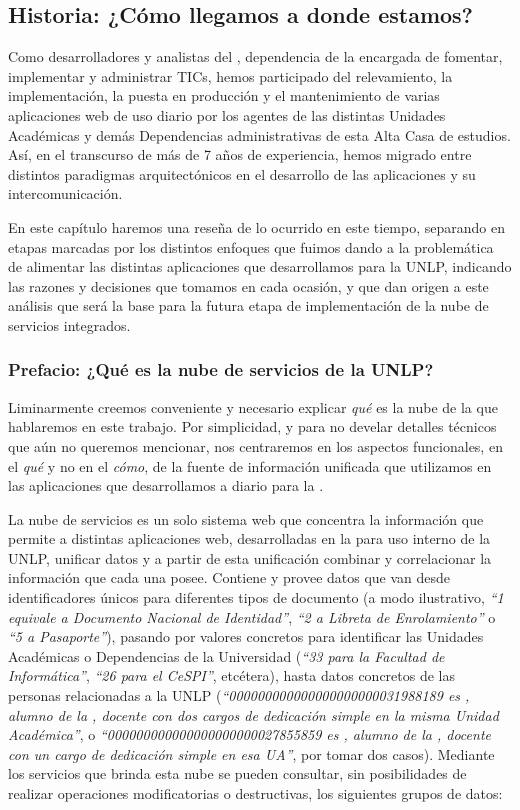 \subsection{Historia: ¿Cómo llegamos a donde estamos?}
\label{nube:historia}

Como desarrolladores y analistas del {\cespi}, dependencia de la {\unlp} encargada de fomentar, implementar y administrar TICs, hemos participado del relevamiento, la implementación, la puesta en producción y el mantenimiento de varias aplicaciones web de uso diario por los agentes de las distintas Unidades Académicas y demás Dependencias administrativas de esta Alta Casa de estudios. Así, en el transcurso de más de 7 años de experiencia, hemos migrado entre distintos paradigmas arquitectónicos en el desarrollo de las aplicaciones y su intercomunicación.

En este capítulo haremos una reseña de lo ocurrido en este tiempo, separando en etapas marcadas por los distintos enfoques que fuimos dando a la problemática de alimentar las distintas aplicaciones que desarrollamos para la UNLP, indicando las razones y decisiones que tomamos en cada ocasión, y que dan origen a este análisis que será la base para la futura etapa de implementación de la nube de servicios integrados.


\subsubsection{Prefacio: ¿Qué es la nube de servicios de la UNLP?}
\label{nube:prefacio}

Liminarmente creemos conveniente y necesario explicar \textit{qué} es la nube de la que hablaremos en este trabajo. Por simplicidad, y para no develar detalles técnicos que aún no queremos mencionar, nos centraremos en los aspectos funcionales, en el \textit{qué} y no en el \textit{cómo}, de la fuente de información unificada que utilizamos en las aplicaciones que desarrollamos a diario para la {\unlp}.

La nube de servicios es un solo sistema web que concentra la información que permite a distintas aplicaciones web, desarrolladas en la {\direccionDesarrollo} para uso interno de la UNLP, unificar datos y a partir de esta unificación combinar y correlacionar la información que cada una posee. Contiene y provee datos que van desde identificadores únicos para diferentes tipos de documento (a modo ilustrativo, \textit{“1 equivale a Documento Nacional de Identidad”}, \textit{“2 a Libreta de Enrolamiento”} o \textit{“5 a Pasaporte”}), pasando por valores concretos para identificar las Unidades Académicas o Dependencias de la Universidad (\textit{“33 para la Facultad de Informática”}, \textit{“26 para el CeSPI”}, etcétera), hasta datos concretos de las personas relacionadas a la UNLP (\textit{“000000000000000000000031988189 es \nahuelcuesta, alumno de la \facultad, docente con dos cargos de dedicación simple en la misma Unidad Académica”}, o \textit{“000000000000000000000027855859 es \miguelcarbone, alumno de la \facultad, docente con un cargo de dedicación simple en esa UA”}, por tomar dos casos). Mediante los servicios que brinda esta nube se pueden consultar, sin posibilidades de realizar operaciones modificatorias o destructivas, los siguientes grupos de datos:

